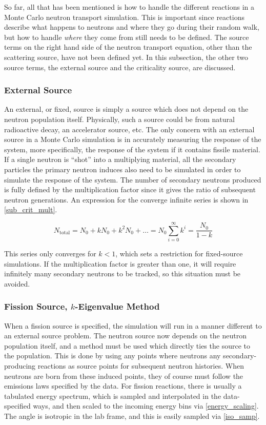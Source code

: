So far, all that has been mentioned is how to handle the different reactions in a Monte Carlo neutron transport simulation.  This is important since reactions describe what happens to neutrons and where they go during their random walk, but how to handle \emph{where} they come from still needs to be defined.  The source terms on the right hand side of the neutron transport equation, other than the scattering source, have not been defined yet.  In this subsection, the other two source terms, the external source and the criticality source, are discussed.

\subsubsection{External Source}

An external, or fixed, source is simply a source which does not depend on the neutron population itself.  Physically, such a source could be from natural radioactive decay, an accelerator source, etc.  The only concern with an external source in a Monte Carlo simulation is in accurately measuring the response of the system, more specifically, the response of the system if it contains fissile material.  If a single neutron is ``shot'' into a multiplying material, all the secondary particles the primary neutron induces also need to be simulated in order to simulate the response of the system.  The number of secondary neutrons produced is fully defined by the multiplication factor since it gives the ratio of subsequent neutron generations.  An expression for the converge infinite series is shown in \eqref{sub_crit_mult}\cite{duderstadt}\cite{jaakko}.

\begin{equation}
\label{sub_crit_mult}
N_\mathrm{total} = N_0 + k N_0 + k^2 N_0 + \dots = N_0 \sum_{i=0}^\infty k^i = \frac{N_0}{1-k}
\end{equation}

This series only converges for $k<1$, which sets a restriction for fixed-source simulations.  If the multiplication factor is greater than one, it will require infinitely many secondary neutrons to be tracked, so this situation must be avoided.

\subsubsection{Fission Source, $k$-Eigenvalue Method}

When a fission source is specified, the simulation will run in a manner different to an external source problem.  The neutron source now depends on the neutron population itself, and a method must be used which directly ties the source to the population.  This is done by using any points where neutrons any secondary-producing reactions as source points for subsequent neutron histories.  When neutrons are born from these induced points, they of course must follow the emissions laws specified by the data.  For fission reactions, there is usually a tabulated energy spectrum, which is sampled and interpolated in the data-specified ways, and then scaled to the incoming energy bins via \eqref{energy_scaling}.  The angle is isotropic in the lab frame, and this is easily sampled via \eqref{iso_samp}.

